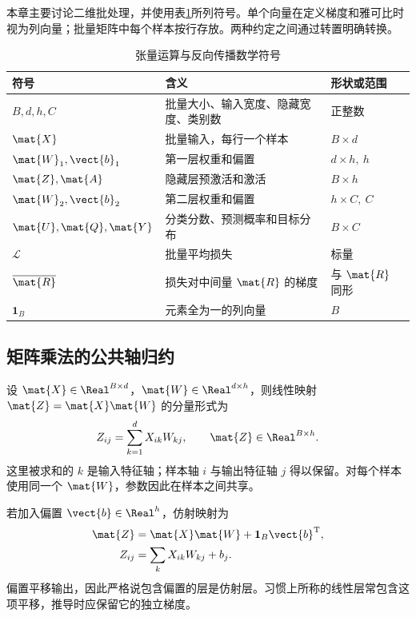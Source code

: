 \documentclass[../textbook.tex]{subfiles}
\begin{document}
本章主要讨论二维批处理，并使用表\ref{tab:tensor-notations}所列符号。单个向量在定义梯度和雅可比时视为列向量；批量矩阵中每个样本按行存放。两种约定之间通过转置明确转换。
\begin{table}[htbp]
\centering
\caption{张量运算与反向传播数学符号}\label{tab:tensor-notations}
\begin{tabularx}{\linewidth}{p{24mm}Xp{26mm}}
\toprule 符号 & 含义 & 形状或范围\\\midrule
$B,d,h,C$ & 批量大小、输入宽度、隐藏宽度、类别数 & 正整数\\
$\mat{X}$ & 批量输入，每行一个样本 & $B\times d$\\
$\mat{W}_1,\vect{b}_1$ & 第一层权重和偏置 & $d\times h,\ h$\\
$\mat{Z},\mat{A}$ & 隐藏层预激活和激活 & $B\times h$\\
$\mat{W}_2,\vect{b}_2$ & 第二层权重和偏置 & $h\times C,\ C$\\
$\mat{U},\mat{Q},\mat{Y}$ & 分类分数、预测概率和目标分布 & $B\times C$\\
$\mathcal L$ & 批量平均损失 & 标量\\
$\overline{\mat{R}}$ & 损失对中间量 $\mat{R}$ 的梯度 & 与 $\mat{R}$ 同形\\
$\mathbf1_B$ & 元素全为一的列向量 & $B$\\
\bottomrule
\end{tabularx}
\end{table}

\subsection{矩阵乘法的公共轴归约}
设 $\mat{X}\in\Real^{B\times d}$，$\mat{W}\in\Real^{d\times h}$，则线性映射 $\mat{Z}=\mat{X}\mat{W}$ 的分量形式为
\begin{equation}
 Z_{ij}=\sum_{k=1}^{d}X_{ik}W_{kj},\qquad \mat{Z}\in\Real^{B\times h}.
\end{equation}
这里被求和的 $k$ 是输入特征轴；样本轴 $i$ 与输出特征轴 $j$ 得以保留。对每个样本使用同一个 $\mat{W}$，参数因此在样本之间共享。

若加入偏置 $\vect{b}\in\Real^h$，仿射映射为
\begin{equation}
\begin{aligned}
 \mat{Z} &= \mat{X}\mat{W}+\mathbf1_B\vect{b}^{\mathrm{T}}, \\
 Z_{ij} &= \sum_kX_{ik}W_{kj}+b_j.
\end{aligned}
\end{equation}
偏置平移输出，因此严格说包含偏置的层是仿射层。习惯上所称的线性层常包含这项平移，推导时应保留它的独立梯度。
\end{document}
